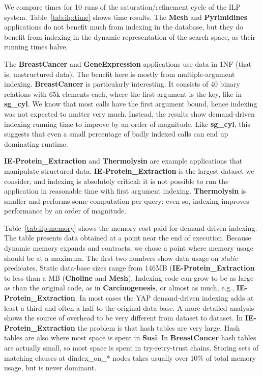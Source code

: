 \documentclass{llncs}
\newcommand{\instr}[1]{\textsf{#1}}
\newcommand{\TryRetryTrust}{\mbox{\instr{try-retry-trust}}\xspace}
\newcommand{\jitiSTAR}{\mbox{\instr{dindex\_on\_*}}\xspace}
\newcommand{\JITI}{demand-driven indexing\xspace}
\newcommand{\bench}[1]{\textbf{\textsf{#1}}}
\newcommand{\sgCyl}{\bench{sg\_cyl}\xspace}
\newcommand{\BreastCancer}{\bench{BreastCancer}\xspace}
\newcommand{\Carcino}{\bench{Carcinogenesis}\xspace}
\newcommand{\GeneExpr}{\bench{GeneExpression}\xspace}
\newcommand{\IEProtein}{\bench{IE-Protein\_Extraction}\xspace}
\newcommand{\Mesh}{\bench{Mesh}\xspace}
\newcommand{\Pyrimidines}{\bench{Pyrimidines}\xspace}
\newcommand{\Thermolysin}{\bench{Thermolysin}\xspace}
\begin{document}

We compare times for 10 runs of the saturation/refinement cycle of the
ILP system. Table~\ref{tab:ilp:time} shows time results.
The \Mesh and \Pyrimidines applications do not benefit much from
indexing in the database, but they do benefit from indexing in the
dynamic representation of the search space, as their running times
halve.

The \BreastCancer and \GeneExpr applications use data in 
1NF (that is, unstructured data). The benefit here is mostly from
multiple-argument indexing. \BreastCancer is particularly
interesting. It consists of 40 binary relations with 65k elements
each, where the first argument is the key, like in \sgCyl. We know
that most calls have the first argument bound, hence indexing was not
expected to matter very much. Instead, the results show \JITI running
time to improve by an order of magnitude. Like \sgCyl, this
suggests that even a small percentage of badly indexed calls can end
up dominating runtime.

\IEProtein and \Thermolysin are example
applications that manipulate structured data.
\IEProtein is the largest dataset we consider,
and indexing is absolutely critical: it is not possible to run the
application in reasonable time with first argument
indexing. \Thermolysin is smaller and performs some
computation per query: even so, indexing improves performance by an
order of magnitude.


Table~\ref{tab:ilp:memory} shows the memory cost paid for \JITI. The
table presents data obtained at a point near the end of execution.
Because dynamic memory expands and contracts, we chose a point where
memory usage should be at a maximum. The first two numbers show data
usage on \emph{static} predicates. Static data-base sizes range from
146MB (\bench{IE-Protein\_Extraction} to less than a MB
(\bench{Choline} and \bench{Mesh}). Indexing code can grow
to be as large as than the original code, as in \Carcino, or
almost as much, e.g., \bench{IE-Protein\_Extraction}. In most cases
the YAP \JITI adds at least a third and often a half to the original
data-base. A more detailed analysis shows the source of overhead to be
very different from dataset to dataset. In
\bench{IE-Protein\_Extraction} the problem is that hash tables are
very large. Hash tables are also where most space is spent in
\bench{Susi}. In \BreastCancer hash tables are actually small, so most
space is spent in \TryRetryTrust chains. Storing sets of matching
clauses at \jitiSTAR nodes takes usually over 10\% of total memory
usage, but is never dominant.
\end{document}
